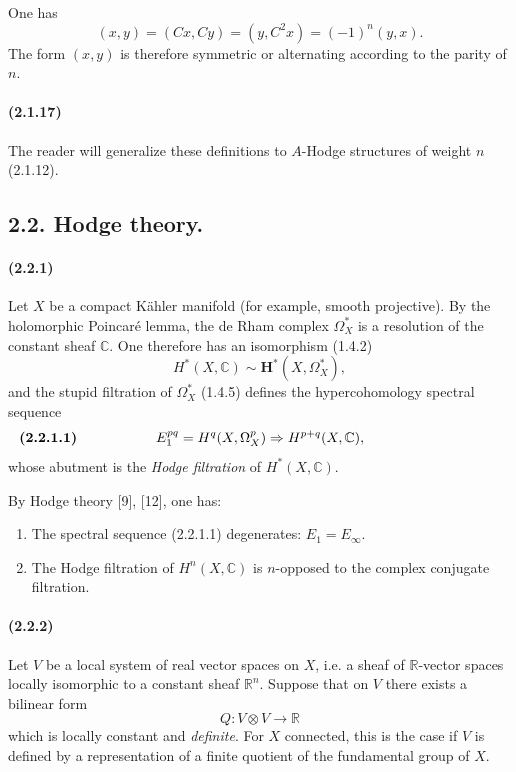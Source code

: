 \documentclass[10pt]{article}
\newcommand{\C}{\mathbb C}
\newcommand{\R}{\mathbb R}
\begin{document}
One has
\[
(x,y)=(Cx,Cy)=(y,C^2x)=(-1)^n(y,x).
\]
The form $(x,y)$ is therefore symmetric or alternating according to the parity of $n$.

\paragraph{(2.1.17)} The reader will generalize these definitions to $A$-Hodge structures of weight $n$ (2.1.12).

\subsection*{2.2. Hodge theory.}

\paragraph{(2.2.1)} Let $X$ be a compact Kähler manifold (for example, smooth projective). By the holomorphic Poincaré lemma, the de Rham complex $\Omega_X^*$ is a resolution of the constant sheaf $\C$. One therefore has an isomorphism (1.4.2)
\[
H^*(X,\C)\sim\mathbf H^*(X,\Omega_X^*),
\]
and the stupid filtration of $\Omega_X^*$ (1.4.5) defines the hypercohomology spectral sequence
\[
\makebox[\textwidth][s]{\textbf{(2.2.1.1)}\hfill$\displaystyle E_1^{pq}=H^q(X,\Omega_X^p)\Rightarrow H^{p+q}(X,\C),$\hfill\phantom{\textbf{(2.2.1.1)}}}
\]
whose abutment is the \emph{Hodge filtration} of $H^*(X,\C)$.

By Hodge theory [9], [12], one has:
\begin{enumerate}[label=(\Alph*)]
\item The spectral sequence (2.2.1.1) degenerates: $E_1=E_\infty$.
\item The Hodge filtration of $H^n(X,\C)$ is $n$-opposed to the complex conjugate filtration.
\end{enumerate}

\paragraph{(2.2.2)} Let $V$ be a local system of real vector spaces on $X$, i.e. a sheaf of $\R$-vector spaces locally isomorphic to a constant sheaf $\R^n$. Suppose that on $V$ there exists a bilinear form
\[
Q:V\otimes V\longrightarrow\R
\]
which is locally constant and \emph{definite}. For $X$ connected, this is the case if $V$ is defined by a representation of a finite quotient of the fundamental group of $X$.
\end{document}
